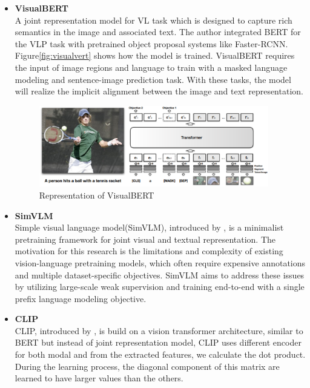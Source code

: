 \begin{itemize}
    \item \textbf{VisualBERT}\\
    A joint representation model for VL task which is designed to capture rich semantics in the image and associated text. The author integrated BERT for the VLP task with pretrained object proposal systems like Faster-RCNN. Figure\ref{fig:visualvert} shows how the model is trained. VisualBERT requires the input of image regions and language to train with a masked language modeling and sentence-image prediction task. With these tasks, the model will realize the implicit alignment between the image and text representation.
    \begin{figure}[htbp]
        \begin{center}
            \includegraphics[width=10cm]{img/VisualBERT.eps}
            \caption{Representation of VisualBERT}
        \end{center}
    \end{figure}

    \item \textbf{SimVLM}\\
    Simple visual language model(SimVLM), introduced by \cite{wang2022simvlm}, is a minimalist pretraining framework for joint visual and textual representation. The motivation for this research is the limitations and complexity of existing vision-language pretraining models, which often require expensive annotations and multiple dataset-specific objectives. SimVLM aims to address these issues by utilizing large-scale weak supervision and training end-to-end with a single prefix language modeling objective.


    \item \textbf{CLIP}\\
    CLIP, introduced by \cite{radford2021learning}, is build on a vision transformer architecture, similar to BERT but instead of joint representation model, CLIP uses different encoder for both modal and from the extracted features, we calculate the dot product. During the learning process, the diagonal component of this matrix are learned to have larger values than the others.
    
\end{itemize}


